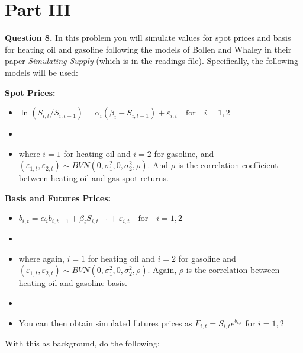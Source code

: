 \documentclass[12pt]{article}
\begin{document}
\newpage

\section*{Part III}

\textbf{Question 8.} In this problem you will simulate values for spot prices and basis for heating oil
            and gasoline following the models of Bollen and Whaley in their paper \textit{Simulating Supply} 
			(which is in the readings file). Specifically, the following models will be used:

 \vspace{5mm}
 \textbf{Spot Prices:}
 \begin{itemize}
  \item $\ln{\left(S_{i,t} / S_{i,t-1}\right)} = \alpha_{i} (\beta_{i} - S_{i,t-1}) + \varepsilon_{i,t} \quad
	  \mbox{for} \quad i = 1, 2$
  \item[]
  \item where $i=1$ for heating oil and $i=2$ for gasoline, and $(\varepsilon_{1,t}, \varepsilon_{2,t}) \sim BVN(0,
	  \sigma_{1}^{2}, 0, \sigma_{2}^{2}, \rho)$. And $\rho$ is the correlation coefficient between heating oil and gas spot returns. 
 \end{itemize}

 \vspace{3mm}
 \textbf{Basis and Futures Prices:}
 \begin{itemize}
  \item $b_{i,t} = \alpha_{i} b_{i,t-1} + \beta_{i} S_{i,t-1} + \varepsilon_{i,t} \quad \mbox{for} \quad i =
	  1,2$
  \item[]
  \item where again, $i = 1$ for heating oil and $i = 2$ for gasoline and $(\varepsilon_{1,t}, \varepsilon_{2,t}) \sim
	      BVN(0, \sigma_{1}^{2}, 0, \sigma_{2}^{2}, \rho)$. Again, $\rho$ is the correlation between heating oil and
		  gasoline basis. 
  \item[]
  \item You can then obtain simulated futures prices as $F_{i,t} = S_{i,t}e^{b_{i,t}}$ for $i = 1,2$
 \end{itemize}

 \vspace{5mm}
 With this as background, do the following:
\end{document}
